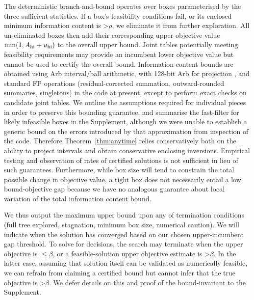 The deterministic branch-and-bound operates over boxes parameterised by the three sufficient statistics. If a box's feasibility conditions fail, or its enclosed minimum information content is >$\rho$, we eliminate it from further exploration. All un-eliminated boxes then add their corresponding upper objective value $\min(1,A_{\rm hi}+u_{\rm hi})$ to the overall upper bound. Joint tables potentially meeting feasibility requirements may provide an incumbent lower objective value but cannot be used to certify the overall bound. Information-content bounds are obtained using Arb interval/ball arithmetic, with 128-bit Arb for projection \citep{johansson2017}, and standard FP operations (residual-corrected summation, outward-rounded summaries, singletons) in the code at present, except to perform exact checks on candidate joint tables. We outline the assumptions required for individual pieces in order to preserve this bounding guarantee, and summarise the fast-filter for likely infeasible boxes in the Supplement, although we were unable to establish a generic bound on the errors introduced by that approximation from inspection of the code. Therefore Theorem~\ref{thm:anytime} relies conservatively both on the ability to project intervals and obtain conservative enclosing inversions. Empirical testing and observation of rates of certified solutions is not sufficient in lieu of such guarantees. Furthermore, while box size will tend to constrain the total possible change in objective value, a tight box does not necessarily entail a low bound-objective gap because we have no analogous guarantee about local variation of the total information content bound.

We thus output the maximum upper bound upon any of termination conditions (full tree explored, stagnation, minimum box size, numerical caution). We will indicate when the solution has converged based on our chosen upper-incumbent gap threshold. To solve for decisions, the search may terminate when the upper objective is $\leq \beta$, or a feasible-solution upper objective estimate is >$\beta$. In the latter case, assuming that solution itself can be validated as numerically feasible, we can refrain from claiming a certified bound but cannot infer that the true objective is >$\beta$. We defer details on this and proof of the bound-invariant to the Supplement.

